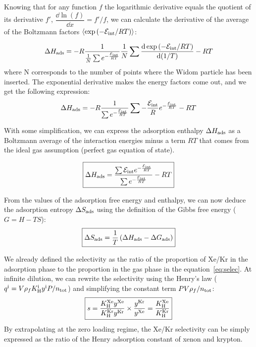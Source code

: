 \documentclass[main.tex]{subfiles}
\begin{document}
Knowing that for any function $f$ the logarithmic derivative equals the quotient of its derivative $f'$, $\dfrac{\dd \ln\left(f\right)}{\dd x}=f'/f$, we can calculate the derivative of the average of the Boltzmann factors $\langle \exp\left(-\mathcal{E}_{\text{int}}/RT\right) \rangle$:

\begin{equation}
  \Delta H_{\text{ads}} = -R\dfrac{1}{\frac{1}{N}\sum e^{-\frac{\mathcal{E}_{\text{int}}}{RT}}} \frac{1}{N}\sum \dfrac{\mathop{}\mathopen{}\mathrm{d} \exp\left(-\mathcal{E}_{\text{int}}/RT\right)}{\mathop{}\mathopen{}\mathrm{d} (1/T)} - RT
\end{equation}
where N corresponds to the number of points where the Widom particle has been inserted.
The exponential derivative makes the energy factors come out, and we get the following expression:
\begin{equation}
  \Delta H_{\text{ads}} = -R\dfrac{1}{\sum e^{-\frac{\mathcal{E}_{\text{int}}}{RT}}} \sum - \frac{\mathcal{E}_{\text{int}}}{R} e^{-\frac{\mathcal{E}_{\text{int}}}{RT}} - RT
\end{equation}

With some simplification, we can express the adsorption enthalpy $\Delta H_{\text{ads}}$ as a Boltzmann average of the interaction energies minus a term $RT$ that comes from the ideal gas assumption (perfect gas equation of state).

\begin{equation}\label{eq:ads_enthalpy}
  \boxed{
  \Delta H_{\text{ads}} = \dfrac{\sum \mathcal{E}_{\text{int}}e^{-\frac{\mathcal{E}_{\text{int}}}{RT}}}{\sum e^{-\frac{\mathcal{E}_{\text{int}}}{RT}}} - RT
  }
\end{equation}

From the values of the adsorption free energy and enthalpy, we can now deduce the adsorption entropy $\Delta S_{\text{ads}}$ using the definition of the Gibbs free energy ($G = H-TS$):
\begin{equation}\label{eq:ads_entropy}
  \boxed{
  \Delta S_{\text{ads}} = \dfrac{1}{T} \left(\Delta H_{\text{ads}} - \Delta G_{\text{ads}} \right)
  }
\end{equation}

We already defined the selectivity as the ratio of the proportion of Xe/Kr in the adsorption phase to the proportion in the gas phase in the equation~\ref{eq:selec}. At infinite dilution, we can rewrite the selectivity using the Henry's law ($q^{\text{i}}=V\rho_fK_{\text{H}}^{\text{i}}y^{\text{i}}P/n_{\text{tot}}$) and simplifying the constant term $PV\rho_f/n_{\text{tot}}$:
\begin{equation}\label{eq:selec_0}
  \boxed{
  s = \dfrac{K_{\text{H}}^{\text{Xe}}y^{\text{Xe}}}{K_{\text{H}}^{\text{Kr}}y^{\text{Kr}}}\times\dfrac{y^{\text{Kr}}}{y^{\text{Xe}}} = \dfrac{K_{\text{H}}^{\text{Xe}}}{K_{\text{H}}^{\text{Kr}}}
  }
\end{equation}
By extrapolating at the zero loading regime, the Xe/Kr selectivity can be simply expressed as the ratio of the Henry adsorption constant of xenon and krypton.
\end{document}
